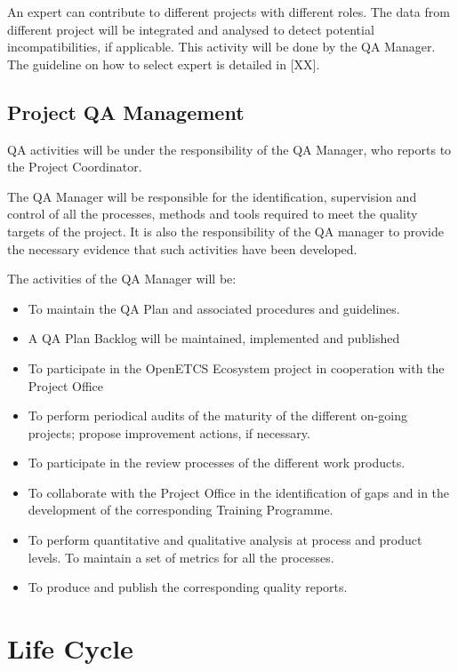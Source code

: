 \documentclass{template/openetcs_article}
\begin{document}
An expert can contribute to different projects with different roles. The data from different project will be integrated and analysed to detect potential incompatibilities, if applicable. This activity will be done by the QA Manager. The guideline on how to select expert is detailed in [XX].


\subsection{Project QA Management}
QA activities will be under the responsibility of the QA Manager, who reports to the Project Coordinator.

The QA Manager will be responsible for the identification, supervision and control of all the processes, methods and tools required to meet the quality targets of the project. It is also the responsibility of the QA manager to provide the necessary evidence that such activities have been developed.

The activities of the QA Manager will be:
\begin{itemize}
\item To maintain the QA Plan and associated procedures and guidelines. 
\item A QA Plan Backlog will be maintained, implemented and published
\item To participate in the OpenETCS Ecosystem project in cooperation with the Project Office
\item To perform periodical audits of the maturity of the different on-going projects; propose improvement actions, if necessary.
\item To participate in the review processes of the different work products.
\item To collaborate with the Project Office in the identification of gaps and in the development of the corresponding Training Programme.
\item To perform quantitative and qualitative analysis at process and product levels. To maintain a set of metrics for all the processes.
\item To produce and publish the corresponding quality reports.
\end{itemize}


\newpage
\section{Life Cycle}

\end{document}
